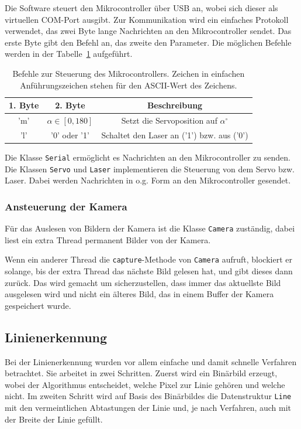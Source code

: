 \documentclass[ngerman,a4paper,parskip=half]{scrartcl}
\begin{document}
Die Software steuert den Mikrocontroller über USB an, wobei sich dieser als virtuellen COM-Port ausgibt. Zur Kommunikation wird ein einfaches Protokoll verwendet, das zwei Byte lange Nachrichten an den Mikrocontroller sendet. Das erste Byte gibt den Befehl an, das zweite den Parameter. Die möglichen Befehle werden in der Tabelle~\ref{tab:protocol} aufgeführt.

\begin{table}
	\centering
	\begin{tabular}{|c|c|c|}
		\hline
		\bfseries 1. Byte & \bfseries 2. Byte & \bfseries Beschreibung \\
		\hline
		'm' & $\alpha \in [0,180]$ & Setzt die Servoposition auf $\alpha^\circ$\\
		\hline
		'l' & '0' oder '1' & Schaltet den Laser an ('1') bzw. aus ('0')\\
		\hline
	\end{tabular}
	\caption{Befehle zur Steuerung des Mikrocontrollers. Zeichen in einfachen Anführungszeichen stehen für den ASCII-Wert des Zeichens.}
	\label{tab:protocol}
\end{table}

Die Klasse \texttt{Serial} ermöglicht es Nachrichten an den Mikrocontroller zu senden. Die Klassen \texttt{Servo} und \texttt{Laser} implementieren die Steuerung von dem Servo bzw. Laser. Dabei werden Nachrichten in o.g. Form an den Mikrocontroller gesendet.

\subsubsection{Ansteuerung der Kamera}

Für das Auslesen von Bildern der Kamera ist die Klasse \texttt{Camera} zuständig, dabei liest ein extra Thread permanent Bilder von der Kamera.

Wenn ein anderer Thread die \texttt{capture}-Methode von \texttt{Camera} aufruft, blockiert er solange, bis der extra Thread das nächste Bild gelesen hat, und gibt dieses dann zurück. Das wird gemacht um sicherzustellen, dass immer das aktuellste Bild ausgelesen wird und nicht ein älteres Bild, das in einem Buffer der Kamera gespeichert wurde.


\subsection{Linienerkennung}

Bei der Linienerkennung wurden vor allem einfache und damit schnelle Verfahren betrachtet. Sie arbeitet in zwei Schritten. Zuerst wird ein Binärbild erzeugt, wobei der Algorithmus entscheidet, welche Pixel zur Linie gehören und welche nicht. Im zweiten Schritt wird auf Basis des Binärbildes die Datenstruktur \texttt{Line} mit den vermeintlichen Abtastungen der Linie und, je nach Verfahren, auch mit der Breite der Linie gefüllt.
\end{document}
